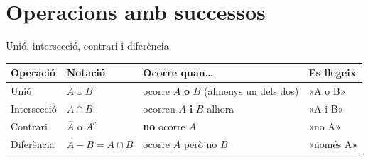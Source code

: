 \documentclass[11pt,a4paper]{article}
\begin{document}
  
\section{Operacions amb successos}\hypertarget{sec2}{}

  

  
\begin{fmdef}{Unió, intersecció, contrari i diferència}
\begin{center}\renewcommand{\arraystretch}{1.7}\small\begin{tabularx}{\linewidth}{>{\raggedright\arraybackslash}p{2.4cm}>{\raggedright\arraybackslash}X>{\raggedright\arraybackslash}X>{\raggedright\arraybackslash}X}\toprule
\textbf{Operació} & \textbf{Notació} & \textbf{Ocorre quan\dots{}} & \textbf{Es llegeix}\\\midrule
Unió & $A\cup B$ & ocorre $A$ \textbf{o} $B$ (almenys un dels dos) & «A o B»\\[3pt]
Intersecció & $A\cap B$ & ocorren $A$ \textbf{i} $B$ alhora & «A i B»\\[3pt]
Contrari & $\overline{A}$ o $A^c$ & \textbf{no} ocorre $A$ & «no A»\\[3pt]
Diferència & $A-B=A\cap\overline{B}$ & ocorre $A$ però no $B$ & «només A»\\[3pt]
\bottomrule\end{tabularx}\end{center}


\end{fmdef}
\end{document}
